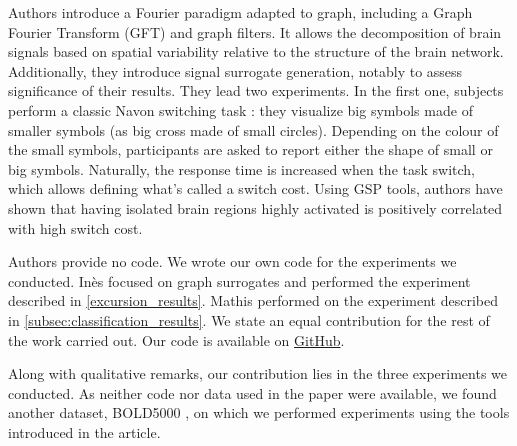 \documentclass[11pt]{article}
\begin{document}
Authors introduce a Fourier paradigm adapted to graph, including a Graph Fourier Transform (GFT) and graph filters. It allows the decomposition of brain signals based on spatial variability relative to the structure of the brain network. Additionally, they introduce signal surrogate generation, notably to assess significance of their results. They lead two experiments. In the first one, subjects perform a classic Navon switching task : they visualize big symbols made of smaller symbols (as big cross made of small circles). Depending on the colour of the small symbols, participants are asked to report either the shape of small or big symbols. Naturally, the response time is increased when the task switch, which allows defining what's called a switch cost. Using GSP tools, authors have shown that having isolated brain regions highly activated is positively correlated with high switch cost.

Authors provide no code. We wrote our own code for the experiments we conducted. Inès focused on graph surrogates and performed the experiment described in \ref{excursion_results}. Mathis performed on the experiment described in \ref{subsec:classification_results}. We state an equal contribution for the rest of the work carried out. Our code is available on \href{https://github.com/InesVATI/TimeSeries-GraphSignalProcessing}{GitHub}.

Along with qualitative remarks, our contribution lies in the three experiments we conducted. As neither code nor data used in the paper were available, we found another dataset, BOLD5000 \cite{chang_bold5000_2019}, on which we performed experiments using the tools introduced in the article.







\printbibliography

\appendix
\appendixpage %




\end{document}
